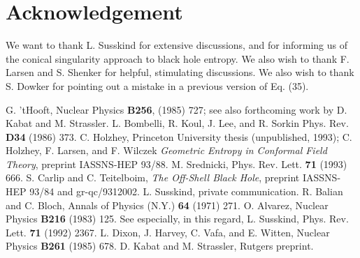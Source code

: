 \documentclass[12pt]{article}
\begin{document}
\section*{Acknowledgement}
We want to thank L. Susskind for extensive discussions, and for informing
us of the conical singularity approach to black hole entropy.
We also wish to thank F. Larsen and S. Shenker for helpful,
stimulating discussions.  We also wish to thank S. Dowker for pointing
out a mistake in a previous version of Eq. (35).



\begin{thebibliography}{99}
 G. 'tHooft, Nuclear Physics {\bf B256}, (1985) 727;
see also forthcoming work by D. Kabat and M. Strassler.
 L. Bombelli, R. Koul, J. Lee, and R. Sorkin
Phys. Rev. {\bf D34} (1986) 373.
C. Holzhey, Princeton University thesis (unpublished,
1993); C. Holzhey, F. Larsen, and F. Wilczek {\it Geometric Entropy in
Conformal Field Theory}, preprint IASSNS-HEP 93/88.
 M. Srednicki, Phys. Rev. Lett. {\bf 71} (1993) 666.
 S. Carlip and C. Teitelboim, {\it The Off-Shell Black
Hole}, preprint IASSNS-HEP 93/84 and gr-qc/9312002.
 L. Susskind, private communication.
 R. Balian and C. Bloch, Annals of Physics (N.Y.) {\bf 64}
(1971) 271.
 O. Alvarez, Nuclear Physics {\bf B216} (1983) 125.
 See especially, in this regard, L. Susskind, Phys.
Rev. Lett. {\bf 71} (1992) 2367.
 L. Dixon, J. Harvey, C. Vafa, and E. Witten,
Nuclear Physics {\bf B261} (1985) 678.
 D. Kabat and M. Strassler, Rutgers preprint.
\end{thebibliography}
\end{document}
